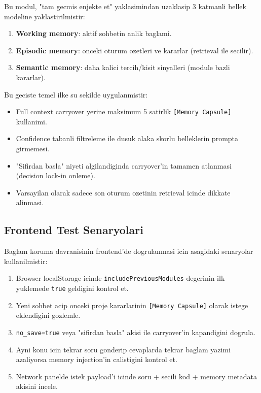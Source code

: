 \documentclass[11pt,a4paper]{article}
\begin{document}
Bu modul, "tam gecmis enjekte et" yaklasimindan uzaklasip 3 katmanli bellek modeline yaklastirilmistir:

\begin{enumerate}[leftmargin=1.5em]
	\item \textbf{Working memory}: aktif sohbetin anlik baglami.
	\item \textbf{Episodic memory}: onceki oturum ozetleri ve kararlar (retrieval ile secilir).
	\item \textbf{Semantic memory}: daha kalici tercih/kisit sinyalleri (module bazli kararlar).
\end{enumerate}

Bu geciste temel ilke su sekilde uygulanmistir:
\begin{itemize}[leftmargin=1.5em]
	\item Full context carryover yerine maksimum 5 satirlik \texttt{[Memory Capsule]} kullanimi.
	\item Confidence tabanli filtreleme ile dusuk alaka skorlu belleklerin prompta girmemesi.
	\item "Sifirdan basla" niyeti algilandiginda carryover'in tamamen atlanmasi (decision lock-in onleme).
	\item Varsayilan olarak sadece son oturum ozetinin retrieval icinde dikkate alinmasi.
\end{itemize}

\subsection{Frontend Test Senaryolari}

Baglam koruma davranisinin frontend'de dogrulanmasi icin asagidaki senaryolar kullanilmistir:
\begin{enumerate}[leftmargin=1.5em]
	\item Browser localStorage icinde \texttt{includePreviousModules} degerinin ilk yuklemede \texttt{true} geldigini kontrol et.
	\item Yeni sohbet acip onceki proje kararlarinin \texttt{[Memory Capsule]} olarak istege eklendigini gozlemle.
	\item \texttt{no\_save=true} veya "sifirdan basla" akisi ile carryover'in kapandigini dogrula.
	\item Ayni konu icin tekrar soru gonderip cevaplarda tekrar baglam yazimi azaliyorsa memory injection'in calistigini kontrol et.
	\item Network panelde istek payload'i icinde soru + secili kod + memory metadata akisini incele.
\end{enumerate}
\end{document}
